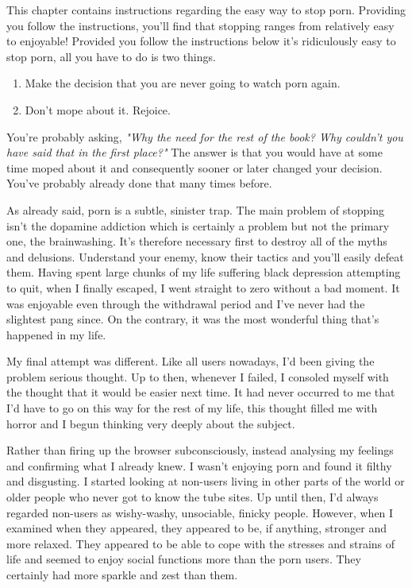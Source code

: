 \documentclass[easypeasy]{subfiles}
\begin{document}
This chapter contains instructions regarding the easy way to stop porn. Providing you follow the instructions, you'll find that stopping ranges from relatively easy to enjoyable! Provided you follow the instructions below it's ridiculously easy to stop porn, all you have to do is two things.

\begin{enumerate}
  \item Make the decision that you are never going to watch porn again.
  \item Don't mope about it. Rejoice.
\end{enumerate}

You're probably asking, \textit{"Why the need for the rest of the book? Why couldn't you have said that in the first place?"} The answer is that you would have at some time moped about it and consequently sooner or later changed your decision. You've probably already done that many times before.

As already said, porn is a subtle, sinister trap. The main problem of stopping isn't the dopamine addiction which is certainly a problem but not the primary one, the brainwashing. It's therefore necessary first to destroy all of the myths and delusions. Understand your enemy, know their tactics and you'll easily defeat them. Having spent large chunks of my life suffering black depression attempting to quit, when I finally escaped, I went straight to zero without a bad moment. It was enjoyable even through the withdrawal period and I've never had the slightest pang since. On the contrary, it was the most wonderful thing that's happened in my life.

My final attempt was different. Like all users nowadays, I'd been giving the problem serious thought. Up to then, whenever I failed, I consoled myself with the thought that it would be easier next time. It had never occurred to me that I'd have to go on this way for the rest of my life, this thought filled me with horror and I begun thinking very deeply about the subject.

Rather than firing up the browser subconsciously, instead analysing my feelings and confirming what I already knew. I wasn't enjoying porn and found it filthy and disgusting. I started looking at non-users living in other parts of the world or older people who never got to know the tube sites. Up until then, I'd always regarded non-users as wishy-washy, unsociable, finicky people. However, when I examined when they appeared, they appeared to be, if anything, stronger and more relaxed. They appeared to be able to cope with the stresses and strains of life and seemed to enjoy social functions more than the porn users. They certainly had more sparkle and zest than them.
\end{document}
